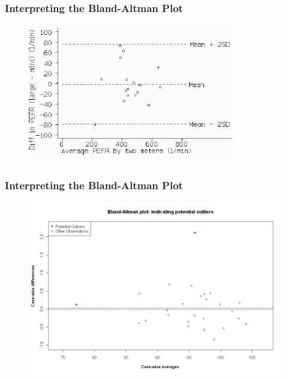 \documentclass[compress]{beamer}        %
\begin{document}
		\begin{frame}
			\frametitle{Interpreting the Bland-Altman Plot}
			
			\begin{figure}
				\centering
				\includegraphics[width=0.95\linewidth]{images/ba2}
				\caption{}
				\label{fig:ba2}
			\end{figure}
			
		\end{frame}
		\begin{frame}
			\frametitle{Interpreting the Bland-Altman Plot}
			\begin{figure}
				\centering
				\includegraphics[width=0.85\linewidth]{images/BAOutliers}
				\caption{}
				\label{fig:BAOutliers}
			\end{figure}
			
		\end{frame}
\end{document}
